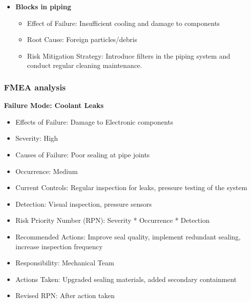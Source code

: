\begin{itemize}
\begin{itemize}
    \end{itemize}
  \item \textbf{Blocks in piping}
    \begin{itemize}
      \item Effect of Failure: Insufficient cooling and damage to components
      \item Root Cause: Foreign particles/debris
      \item Risk Mitigation Strategy: Introduce filters in the piping system and conduct regular cleaning maintenance.
    \end{itemize}
\end{itemize}


\subsubsection{FMEA analysis}

\textbf{Failure Mode: Coolant Leaks}
\begin{itemize}
  \item Effects of Failure: Damage to Electronic components
  \item Severity: High
  \item Causes of Failure: Poor sealing at pipe joints
  \item Occurrence: Medium
  \item Current Controls: Regular inspection for leaks, pressure testing of the system
  \item Detection: Visual inspection, pressure sensors
  \item Risk Priority Number (RPN): Severity * Occurrence * Detection
  \item Recommended Actions: Improve seal quality, implement redundant sealing, increase inspection frequency
  \item Responsibility: Mechanical Team
  \item Actions Taken: Upgraded sealing materials, added secondary containment
  \item Revised RPN: After action taken
\end{itemize}

